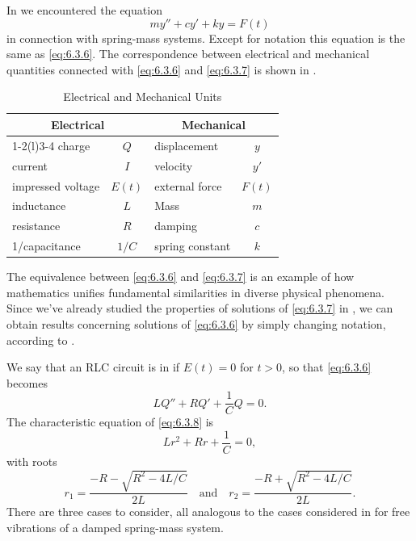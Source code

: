 In  we encountered the
equation
\begin{equation} \label{eq:6.3.7}
my''+cy'+ky=F(t)
\end{equation}
in connection with spring-mass systems. Except for notation this
equation is the same as \eqref{eq:6.3.6}. The correspondence between
electrical and mechanical quantities connected with \eqref{eq:6.3.6} and
\eqref{eq:6.3.7} is shown in .


\begin{table}
\caption{Electrical and Mechanical Units}
\label{table:6.3.2}
\centering
{}
\begin{tabular}{lc lc}\toprule
\multicolumn{2}{c}{Electrical}&
\multicolumn{2}{c}{Mechanical}\\\cmidrule(r){1-2}\cmidrule(l){3-4}
charge& $Q$& displacement&$y$\\
current&$I$&velocity&$y'$\\
impressed voltage&$E(t)$&external force&$F(t)$\\
inductance&$L$&Mass&$m$\\
resistance&$R$&damping&$c$\\
1/capacitance&$1/C$&spring constant&$k$\\
\bottomrule
\end{tabular}
\end{table}

The equivalence between \eqref{eq:6.3.6} and \eqref{eq:6.3.7} is an example of
how mathematics unifies fundamental similarities in diverse physical
phenomena. Since we've already studied the properties of solutions of
\eqref{eq:6.3.7} in , we
can obtain
results concerning solutions of \eqref{eq:6.3.6} by simply changing
notation, according to .



We say that an RLC circuit is in  if $E(t)=0$
for $t>0$, so that \eqref{eq:6.3.6} becomes
\begin{equation} \label{eq:6.3.8}
LQ''+RQ'+\frac{1}{C}Q=0.
\end{equation}
The characteristic equation of \eqref{eq:6.3.8} is
\[
Lr^2+Rr+\frac{1}{C}=0,
\]
with roots
\begin{equation}\label{eq:6.3.9}
r_1=\frac{-R-\sqrt{R^2-4L/C}}{2L}\quad\text{and}\quad  r_2=
\frac{-R+\sqrt{R^2-4L/C}}{2L}.
\end{equation}
There are three cases to consider, all analogous to the cases
considered in  for free vibrations of a damped
spring-mass system.

